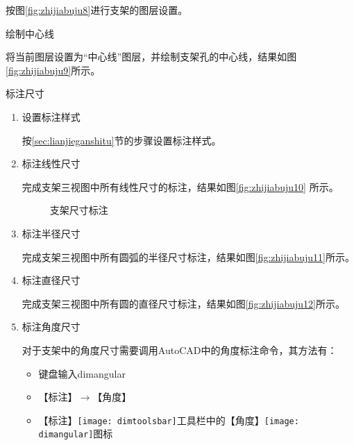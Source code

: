 \begin{procedure}
按图\ref{fig:zhijiabuju8}进行支架的图层设置。
\begin{figure}[htbp]
\centering
\begin{floatrow}[2]
\end{floatrow}
\end{figure}
\item 绘制中心线

将当前图层设置为“中心线”图层，并绘制支架孔的中心线，结果如图\ref{fig:zhijiabuju9}所示。

\item 标注尺寸
\begin{enumerate}
\item 设置标注样式

按\ref{sec:lianjieganshitu}节的步骤设置标注样式。

\item 标注线性尺寸

完成支架三视图中所有线性尺寸的标注，结果如图\ref{fig:zhijiabuju10} 所示。

\begin{figure}[htbp]
\centering
{}\hspace{20pt}
\hspace{20pt}
\hspace{20pt}
\caption{支架尺寸标注}
\end{figure}

\item 标注半径尺寸

完成支架三视图中所有圆弧的半径尺寸标注，结果如图\ref{fig:zhijiabuju11}所示。

\item 标注直径尺寸

完成支架三视图中所有圆的直径尺寸标注，结果如图\ref{fig:zhijiabuju12}所示。
\item 标注角度尺寸

对于支架中的角度尺寸需要调用AutoCAD中的角度标注命令，其方法有：
\begin{itemize}
\item 键盘输入dimangular
\item 【标注】$\rightarrow $【角度】
\item 【标注】\texttt{[image: dimtoolsbar]}工具栏中的【角度】\texttt{[image: dimangular]}图标
\end{itemize}


\end{enumerate}
\end{procedure}
